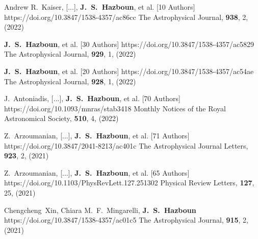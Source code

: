          {Andrew R.~{Kaiser}, [...], \textbf{J.~S.~{Hazboun}}, et al. [10 Authors]}
         {https://doi.org/{10.3847/1538-4357/ac86cc}}
         {{The Astrophysical Journal}, \textbf{{938}}, {2}, (2022)}

         {\textbf{J.~S.~{Hazboun}}, et al. [30 Authors]}
         {https://doi.org/10.3847/1538-4357/ac5829}
         {{The Astrophysical Journal}, \textbf{929}, 1, (2022)}

         {\textbf{J.~S.~{Hazboun}}, et al. [20 Authors]}
         {https://doi.org/10.3847/1538-4357/ac54ae}
         {{The Astrophysical Journal}, \textbf{928}, 1, (2022)}

         {J.~{Antoniadis}, [...], \textbf{J.~S.~{Hazboun}}, et al. [70 Authors]}
         {https://doi.org/10.1093/mnras/stab3418}
         {{Monthly Notices of the Royal Astronomical Society}, \textbf{510}, 4, (2022)}

         {Z.~{Arzoumanian}, [...], \textbf{J.~S.~{Hazboun}}, et al. [71 Authors]}
         {https://doi.org/10.3847/2041-8213/ac401c}
         {{The Astrophysical Journal Letters}, \textbf{923}, 2, (2021)}

         {Z.~{Arzoumanian}, [...], \textbf{J.~S.~{Hazboun}}, et al. [65 Authors]}
         {https://doi.org/10.1103/PhysRevLett.127.251302}
         {{Physical Review Letters}, \textbf{127}, 25, (2021)}

         {Chengcheng~{Xin}, Chiara M.~F.~{Mingarelli}, \textbf{J.~S.~Hazboun}}
         {https://doi.org/10.3847/1538-4357/ac01c5}
         {{The Astrophysical Journal}, \textbf{915}, 2, (2021)}

